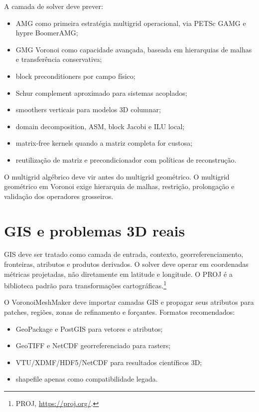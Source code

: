\documentclass[11pt,a4paper]{article}
\begin{document}
A camada de solver deve prever:
\begin{itemize}
  \item AMG como primeira estrat\'egia multigrid operacional, via PETSc GAMG e hypre BoomerAMG;
  \item GMG Voronoi como capacidade avan\c{c}ada, baseada em hierarquias de malhas e transfer\^encia conservativa;
  \item block preconditioners por campo f\'isico;
  \item Schur complement aproximado para sistemas acoplados;
  \item smoothers verticais para modelos 3D columnar;
  \item domain decomposition, ASM, block Jacobi e ILU local;
  \item matrix-free kernels quando a matriz completa for custosa;
  \item reutiliza\c{c}\~ao de matriz e precondicionador com pol\'iticas de reconstru\c{c}\~ao.
\end{itemize}

O multigrid alg\'ebrico deve vir antes do multigrid geom\'etrico. O multigrid geom\'etrico em Voronoi exige hierarquia de malhas, restri\c{c}\~ao, prolonga\c{c}\~ao e valida\c{c}\~ao dos operadores grosseiros.

\section{GIS e problemas 3D reais}

GIS deve ser tratado como camada de entrada, contexto, georreferenciamento, fronteiras, atributos e produtos derivados. O solver deve operar em coordenadas m\'etricas projetadas, n\~ao diretamente em latitude e longitude. O PROJ \'e a biblioteca padr\~ao para transforma\c{c}\~oes cartogr\'aficas.\footnote{PROJ, \url{https://proj.org/}.}

O VoronoiMeshMaker deve importar camadas GIS e propagar seus atributos para patches, regi\~oes, zonas de refinamento e for\c{c}antes. Formatos recomendados:
\begin{itemize}
  \item GeoPackage e PostGIS para vetores e atributos;
  \item GeoTIFF e NetCDF georreferenciado para rasters;
  \item VTU/XDMF/HDF5/NetCDF para resultados cient\'ificos 3D;
  \item shapefile apenas como compatibilidade legada.
\end{itemize}
\end{document}
